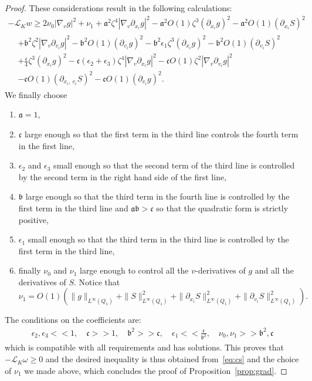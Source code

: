 \documentclass[10pt]{amsart}
\theoremstyle{definition}\newtheorem{defi}[theo]{Definition}\newtheorem{rema}[theo]{Remark}\newtheorem{exam}[theo]{Example}\newtheorem{exem}[theo]{Example}\newtheorem{nota}[theo]{Notation}
\newcommand{\cL}{\mathcal{L}}
\newcommand{\frka}{\mathfrak{a}}
\newcommand{\frkb}{\mathfrak{b}}
\newcommand{\frkc}{\mathfrak{c}}
\begin{document}
\begin{proof}
These considerations result in the following calculations:
\begin{multline*}
- \cL_K w \ge 2 \nu_0 \left|\nabla_v g\right|^2 + \nu_1 + \frka^2 \zeta^4 \left|\nabla_v
\partial_{x_i}g\right|^2 - \frka^2 O(1) \zeta^3 \left(\partial_{x_i}g\right)^2 - \frka^2 O(1) (\partial_{x_i}S)^2 \\
\begin{aligned}
& + \frkb^2 \zeta^2 \left|\nabla_v \partial_{v_i} g\right|^2 - \frkb^2 O(1) \left(\partial_{v_i} g\right)^2 - \frkb^2 \epsilon_1 \zeta^3 \left(\partial_{x_i}g\right)^2 - \frkb^2 O(1) \left(\partial_{v_i} S\right)^2 \\
& + \frac{\frkc}4 \zeta^3 \left(\partial_{x_i} g\right)^2 - \frkc \left(\epsilon_2 +\epsilon_3\right) \zeta^4 \left|\nabla_v\partial_{x_i}g\right|^2 - \frkc O(1) \zeta^2 \left|\nabla_v \partial_{v_i} g \right|^2 \\
& - \frkc O(1) \left(\partial_{x_i,\,v_i}S\right)^2 - \frkc O(1) \left(\partial_{v_i}g\right)^2.
\end{aligned}
\end{multline*}
We finally choose
\begin{enumerate}
\item \label{proofprop3.1.2.1}$\frka=1$,
\item \label{proofprop3.1.2.2}$\frkc$ large enough so that the first term in the third line controls the fourth term in the first line,
\item \label{proofprop3.1.2.3}$\epsilon_2$ and $\epsilon_3$ small enough so that the second term of the third line is controlled by the second term in the right hand side of the first line,
\item \label{proofprop3.1.2.4}$\frkb$ large enough so that the third term in the fourth line is controlled by the first term in the third line and $\frka \frkb > \frkc$ so that the quadratic form is strictly positive,
\item \label{proofprop3.1.2.5}$\epsilon_1$ small enough so that the third term in the third line is controlled by the first term in the third line,
\item \label{proofprop3.1.2.6}finally $\nu_0$ and $\nu_1$ large enough to control all the $v$-derivatives of $g$ and all the derivatives of $S$. Notice that
\[
\nu_1 = O(1)\left(\| g \|_{L^\infty(Q_1)} + \|S\|_{L^\infty(Q_1)}^2 + \|\partial_{x_i} S\|_{L^\infty(Q_1)}^2+ \|\partial_{v_i} S\|_{L^\infty(Q_1)}^2\right).
\]
\end{enumerate}
The conditions on the coefficients are:
\begin{align*}
\epsilon_2, \epsilon_3 <<1, \quad \frkc >> 1, \quad
\frkb^2 >> \frkc, \quad
\epsilon_1 << \frac{\frkc}{\frkb^2}, \quad
\nu_0, \nu_1 >> \frkb^2, \frkc
\end{align*}
which is compatible with all requirements and has solutions. This proves that $-\cL_K \omega \ge 0$ and the desired inequality is thus obtained from~\eqref{eq:cs} and the choice of $\nu_1$ we made above, which concludes the proof of Proposition~\ref{prop:grad}.
\end{proof}
\end{document}

